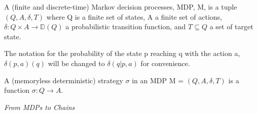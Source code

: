 \begin{definition}
\label{Markov decision processes}
A (finite and discrete-time) Markov decision processes, MDP, M, is a tuple $(Q,A,\delta,T)$ 
where Q is a finite set of states, A a finite set of actions, $\delta: Q \times A \rightarrow \mathbb{D}(Q)$ 
a probabilistic transition function, and $T\subseteq Q$ a set of target state.
\end{definition}

\noindent
The notation for the probability of the state p reaching q with the action a, $\delta(p,a)(q)$ will be changed to 
$\delta(q|p,a)$ for convenience.

\begin{definition}[Strategies]
\label{Strategies}
A (memoryless deterministic) strategy $\sigma$ in an MDP M = $(Q,A,\delta,T)$ is a function $\sigma: Q\rightarrow A$.
\end{definition}

\textit{From MDPs to Chains}


